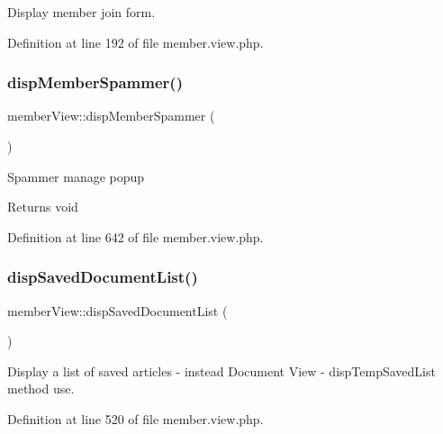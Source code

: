 Display member join form. 



Definition at line 192 of file member.\+view.\+php.

\mbox{\label{classmemberView_a89f56007be451ba8c4136a2e25d343ec}} 
\subsubsection{\texorpdfstring{disp\+Member\+Spammer()}{dispMemberSpammer()}}
{\footnotesize\ttfamily member\+View\+::disp\+Member\+Spammer (\begin{DoxyParamCaption}{ }\end{DoxyParamCaption})}

Spammer manage popup

\begin{DoxyReturn}{Returns}
void 
\end{DoxyReturn}


Definition at line 642 of file member.\+view.\+php.

\mbox{\label{classmemberView_a30c84f97c62c8767ebd86dc943ae2b28}} 
\subsubsection{\texorpdfstring{disp\+Saved\+Document\+List()}{dispSavedDocumentList()}}
{\footnotesize\ttfamily member\+View\+::disp\+Saved\+Document\+List (\begin{DoxyParamCaption}{ }\end{DoxyParamCaption})}



Display a list of saved articles  -\/ instead Document View -\/ disp\+Temp\+Saved\+List method use. 



Definition at line 520 of file member.\+view.\+php.

\mbox{\label{classmemberView_a966e235b7cf76bcdddf07e601d7812b3}} 
